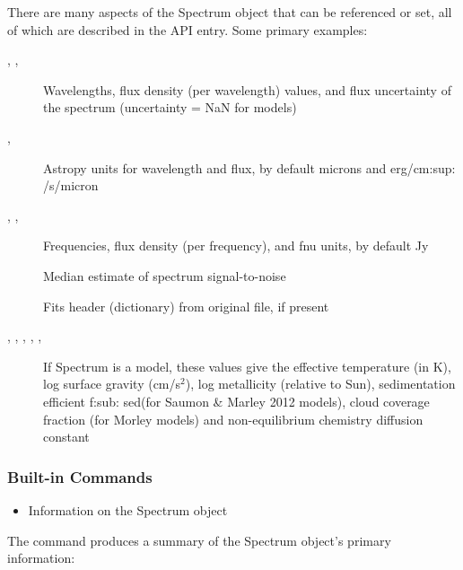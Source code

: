 \documentclass[letterpaper,10pt,english]{sphinxmanual}
\begin{document}
There are many aspects of the Spectrum object that can be referenced or set, all of which are
described in the API entry. Some primary examples:
\begin{description}
\item[{, , }] \leavevmode
Wavelengths, flux density (per wavelength) values, and flux uncertainty of the spectrum (uncertainty = NaN for models)

\item[{, }] \leavevmode
Astropy units for wavelength and flux, by default microns and erg/cm:sup: /s/micron

\item[{, , }] \leavevmode
Frequencies, flux density (per frequency), and fnu units, by default Jy

\item[{}] \leavevmode
Median estimate of spectrum signal-to-noise

\item[{}] \leavevmode
Fits header (dictionary) from original file, if present

\item[{, , , , , }] \leavevmode
If Spectrum is a model, these values give the effective temperature (in K), log surface gravity (cm/s$^{\text{2}}$),
log metallicity (relative to Sun), sedimentation efficient f:sub: sed(for Saumon \& Marley 2012 models),
cloud coverage fraction (for Morley models) and non-equilibrium chemistry diffusion constant

\end{description}


\subsubsection{Built-in Commands}
\label{splat:built-in-commands}\begin{itemize}
\item {} 
Information on the Spectrum object

\end{itemize}

The  command produces a summary of the Spectrum object's primary information:
\end{document}
